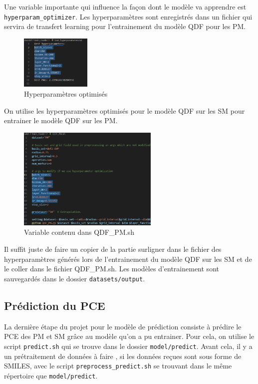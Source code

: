 Une variable importante qui influence la façon dont le modèle va apprendre est \texttt{hyperparam\_optimizer}.
Les hyperparamètres sont enregistrés dans un fichier qui servira de transfert learning pour l'entrainement du modèle QDF pour les PM.

\begin{figure}[H]
    \centering
    \includegraphics[width=0.3\textwidth]{GuideUtilisateur/hyper1.png}
    \caption{Hyperparamètres optimisés}
\end{figure}

On utilise les hyperparamètres optimisés pour le modèle QDF sur les SM pour entrainer le modèle QDF sur les PM.

\begin{figure}[H]
    \centering
    \includegraphics[width=0.6\textwidth]{GuideUtilisateur/pm1.png}
    \caption{Variable contenu dans QDF\_PM.sh}
\end{figure}

Il suffit juste de faire un copier de la partie surligner dans le fichier des hyperparamètres générés lors de l'entrainement du modèle QDF sur les SM et de le coller dans le fichier QDF\_PM.sh.
Les modèles d'entrainement sont sauvegardés dans le dossier \texttt{datasets/output}.

\subsection{Prédiction du PCE}

La dernière étape du projet pour le modèle de prédiction consiste à prédire le PCE des PM et SM grâce au modèle qu'on a pu entrainer. Pour cela, on utilise le script \texttt{predict.sh} qui se trouve dans le dossier \texttt{model/predict}.
Avant cela, il y a un prétraitement de données à faire , si les données reçues sont sous forme de SMILES, avec le script \texttt{preprocess\_predict.sh} se trouvant dans le même répertoire que \texttt{model/predict}. 

